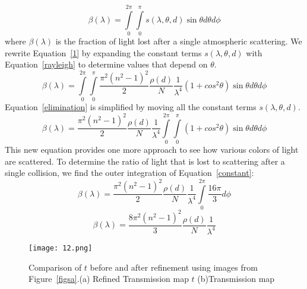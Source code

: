 \documentclass[doctor,english,listoffigures,listoftables]{thesis-uestc}
\begin{document}
\begin{equation}\label{1}
\beta(\lambda)=\int\limits_0^{2\pi} \int\limits_0^\pi s(\lambda,\theta,d) \sin{\theta} d\theta d\phi
\end{equation}
where $ \beta(\lambda)$ is the fraction of light lost after a single atmospheric scattering. We rewrite Equation~\ref{1} by expanding the constant terms $s(\lambda,\theta,d)$ with Equation~\ref{rayleigh} to determine values that depend on $\theta$.
\begin{equation}\label{elimination}
\beta(\lambda)=\int\limits_0^{2\pi} \int\limits_0^\pi \frac{\pi^2(n^2-1)^2}{2} \frac{\rho(d)}{N} \frac{1}{\lambda ^4} (1+cos^2\theta)\sin{\theta} d\theta d\phi \end{equation}
Equation~\ref{elimination} is simplified by moving all the constant terms $s(\lambda,\theta,d)$.
\begin{equation}\label{constant}
\beta(\lambda)= \frac{\pi^2(n^2-1)^2}{2} \frac{\rho(d)}{N} \frac{1}{\lambda ^4}\int\limits_0^{2\pi} \int\limits_0^\pi (1+cos^2\theta)\sin{\theta} d\theta d\phi \end{equation}
This new equation provides one more approach to see how various colors of light are scattered. To determine the ratio of light that is lost to scattering after a single collision, we find the outer integration of Equation~\ref{constant}:
\begin{equation}\label{inner}
\beta(\lambda)= \frac{\pi^2(n^2-1)^2}{2} \frac{\rho(d)}{N} \frac{1}{\lambda ^4}\int\limits_0^{2\pi} \frac{16\pi}{3} d\phi \end{equation}
\begin{equation}\label{inner}
\beta(\lambda)= \frac{8\pi^2(n^2-1)^2}{3} \frac{\rho(d)}{N} \frac{1}{\lambda ^4} \end{equation}
\begin{figure}[H]
	\centering
	\texttt{[image: 12.png]}
	\caption{Comparison of $t$ before and after refinement using images from Figure~\ref{figsa}.(a) Refined Transmission map $t$ (b)Transmission map}
	\label{fig12}
\end{figure}
\end{document}
